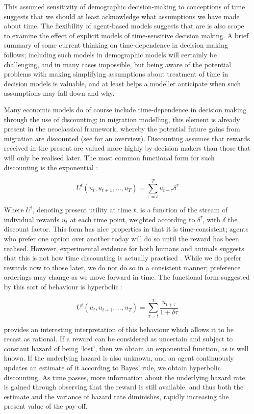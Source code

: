 \documentclass{article}
\begin{document}
This assumed sensitivity of demographic decision-making to conceptions
of time suggests that we should at least acknowledge what assumptions we
have made about time. The flexibility of agent-based models suggests
that are is also scope to examine the effect of explicit models of
time-sensitive decision making. A brief summary of some current thinking
on time-dependence in decision making follows; including such models in
demographic models will certainly be challenging, and in many cases
impossible, but being aware of the potential problems with making
simplifying assumptions about treatment of time in decision models is
valuable, and at least helps a modeller anticipate when such assumptions
may fall down and why.

Many economic models do of course include time-dependence in decision
making through the use of discounting; in migration modelling, this element is already present in the neoclassical framework, whereby the potential future gains from migration are discounted (see \citet{Massey1993} for an overview). Discounting assumes that rewards
received in the present are valued more highly by decision makers than
those that will only be realised later. The most common functional form
for such discounting is the exponential \citep{ODonoghue2000}:

\[
U^{t}(u_t, u_{t+1},\dots,u_T ) = \sum_{\tau=t}^{T} u_{t+\tau}\delta^{\tau}
\]

Where \(U^t\), denoting present utility at time \(t\), is a function of
the stream of individual rewards \(u_t\) at each time point, weighted
according to \(\delta^{\tau}\), with \(\delta\) the discount factor.
This form has nice properties in that it is time-consistent; agents who
prefer one option over another today will do so until the reward has
been realised. However, experimental evidence for both humans and
animals suggests that this is not how time discounting is actually
practised \citep{Boyer2008}. While we do prefer rewards now to those
later, we do not do so in a consistent manner; preference orderings may
change as we move forward in time. The functional form suggested by this sort of behaviour is hyperbolic \citep{Benhabib2010}:

\[
U^{t}(u_t, u_{t+1},\dots,u_T ) = \sum_{\tau=t}^{T} \frac{ u_{t+\tau}}{1+\delta\tau}
\]

\citet{Sozou1998} provides an interesting interpretation of this
behaviour which allows it to be recast as rational. If a reward can be
considered as uncertain and subject to constant hazard of being `lost',
then we obtain an exponential function, as is well known. If the
underlying hazard is also unknown, and an agent continuously updates an
estimate of it according to Bayes' rule, we obtain hyperbolic
discounting. As time passes, more information about the underlying
hazard rate is gained through observing that the reward is still
available, and thus both the estimate and the variance of hazard rate
diminishes, rapidly increasing the present value of the pay-off.
\end{document}
